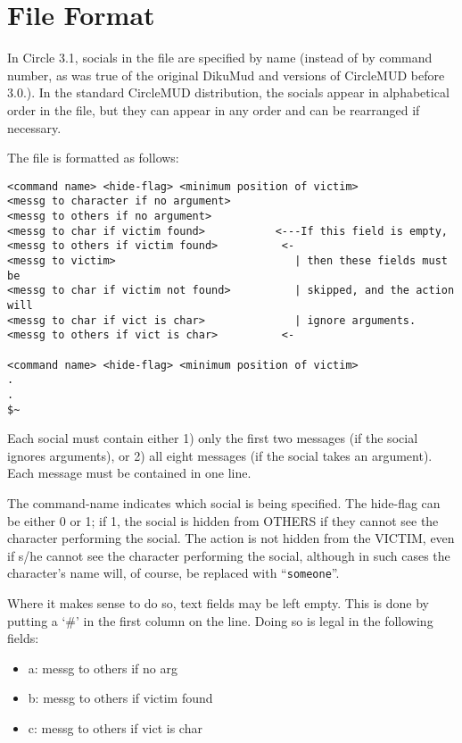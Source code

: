 \documentclass[11pt]{article}
\begin{document}
\section{File Format}
In Circle 3.1, socials in the file are specified by name (instead of by command number, as was true of the original DikuMud and versions of CircleMUD before 3.0.).  In the standard CircleMUD distribution, the socials appear in alphabetical order in the file, but they can appear in any order and can be rearranged if necessary.
\par
The file is formatted as follows:
\begin{verbatim}
<command name> <hide-flag> <minimum position of victim>
<messg to character if no argument>
<messg to others if no argument>
<messg to char if victim found>           <---If this field is empty,
<messg to others if victim found>          <- 
<messg to victim>                            | then these fields must be
<messg to char if victim not found>          | skipped, and the action will
<messg to char if vict is char>              | ignore arguments.
<messg to others if vict is char>          <-

<command name> <hide-flag> <minimum position of victim>
.
.
$~
\end{verbatim}
Each social must contain either 1) only the first two messages (if the social ignores arguments), or 2) all eight messages (if the social takes an argument). Each message must be contained in one line.
\par
The command-name indicates which social is being specified.  The hide-flag can be either 0 or 1; if 1, the social is hidden from OTHERS if they cannot see the character performing the social.  The action is not hidden from the VICTIM, even if s/he cannot see the character performing the social, although in such cases the character's name will, of course, be replaced with ``\texttt{someone}''.
\par
Where it makes sense to do so, text fields may be left empty. This is done by putting a `\#' in the first column on the line.  Doing so is legal in the following fields:
\begin{itemize}
\item a: messg to others if no arg
\item b: messg to others if victim found
\item c: messg to others if vict is char
\end{itemize}
\end{document}
